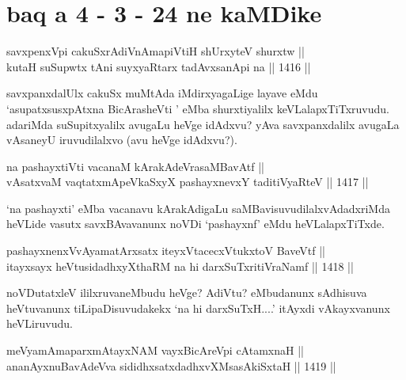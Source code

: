 \section*{baq a 4 - 3 - 24 ne kaMDike}

\begin{shl}
savxpenxV\s pi cakuSxrAdiVnAmapiVtiH shUrxyteV shurxtw || \\
kutaH suSupwtx tAni suyxyaRtarx tadAvxsanA\s pi na \hfill || 1416 ||  
\end{shl}

\begin{artha}
savxpanxdalUlx cakuSx muMtAda iMdirxyagaLige layave eMdu `asupatxsusxpAtxna BicArasheVti ' eMba shurxtiyalilx keVLalapxTiTxruvudu. adariMda suSupitxyalilx avugaLu heVge idAdxvu? yAva savxpanxdalilx avugaLa vAsaneyU iruvudilalxvo (avu heVge idAdxvu?).
\end{artha}

\begin{shl}
na pashayxtiVti vacanaM kArakAdeVrasaMBavAtf || \\
vAsatxvaM vaqtatxmApeVkaSxyX pashayxnevxY taditiVyaRteV \hfill || 1417 ||  
\end{shl}

\begin{artha}
`na pashayxti' eMba vacanavu kArakAdigaLu saMBavisuvudilalxvAdadxriMda heVLide vasutx savxBAvavanunx noVDi `pashayxnf' eMdu heVLalapxTiTxde.
\end{artha}

\begin{shl}
pashayxnenxVvAyamatArx\s \s satx iteyxVtacecxVtukxtoV BaveVtf ||  \\
itayxsayx heVtusidadhxyXthaRM na hi darxSuTxritiVraNamf \hfill || 1418 || 
\end{shl}

\begin{artha}
noVDutatxleV ililxruvaneMbudu heVge? AdiVtu? eMbudanunx sAdhisuva heVtuvanunx tiLipaDisuvudakekx `na hi darxSuTxH....' itAyxdi vAkayxvanunx heVLiruvudu.
\end{artha}


\begin{shl}
meVyamAmaparxmAtayxNAM vayxBicAreV\s pi cA\s \s tamxnaH || \\
ananAyxnuBavAdeVva sididhxsatxdadhxvXMsasAkiSxtaH \hfill || 1419 ||  
\end{shl}

